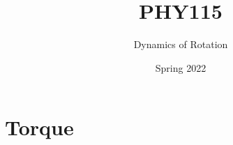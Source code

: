 \documentclass[]{beamer}
\title{PHY115}    %
\author{Dynamics of Rotation}                 %
\institute{Digipen}      %
\date{Spring 2022}
\begin{document}
\begin{frame}
  \titlepage
\end{frame}

\section[]{}

\begin{frame}
  \tableofcontents
\end{frame}

\section{Torque}




\end{document}
